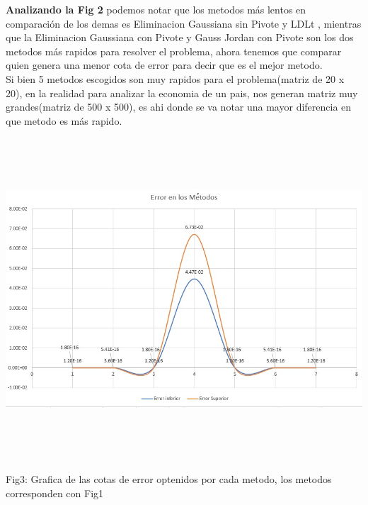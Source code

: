 \documentclass[10pt,a4paper]{article}
\begin{document}
\begin{multicols}{2}
\noindent \textbf{Analizando la Fig 2} podemos notar que los metodos más lentos en comparación de los demas es Eliminacion Gaussiana sin Pivote y LDLt , mientras que la Eliminacion Gaussiana con Pivote y Gauss Jordan con Pivote son los dos metodos más rapidos para resolver el problema, ahora tenemos que comparar quien genera una menor cota de error para decir que es el mejor metodo.\\
\noindent Si bien 5 metodos escogidos son muy rapidos para el problema(matriz de 20 x 20), en la realidad para analizar la economia de un pais, nos generan matriz muy grandes(matriz de 500 x 500), es ahi donde se va notar una mayor diferencia en que metodo es más rapido.
\end{multicols}

\begin{center}
	\centering
\includegraphics[width=15.5cm,height=12cm]{Errorenlosmetodos}
	
	Fig3: Grafica de las cotas de error optenidos por cada metodo, los metodos corresponden con Fig1
\end{center}
\end{document}
